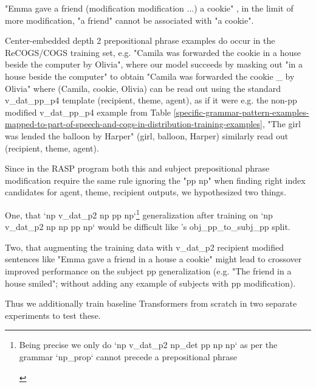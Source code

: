\documentclass[11pt]{article}
\begin{document}
{\begin{footnotesize}
"Emma gave a friend (modification modification ...) a cookie" , in the limit of more modification, "a friend" cannot be associated with "a cookie".

Center-embedded depth 2 prepositional phrase examples do occur in the ReCOGS/COGS training set, e.g. "Camila was forwarded the cookie in a house beside the computer by Olivia", where our model succeeds by masking out "in a house beside the computer" to obtain "Camila was forwarded the cookie \_ by Olivia" where (Camila, cookie, Olivia) can be read out using the standard v\_dat\_pp\_p4 template (recipient, theme, agent), as if it were e.g. the non-pp modified v\_dat\_pp\_p4 example from Table \ref{specific-grammar-pattern-examples-mapped-to-part-of-speech-and-cogs-in-distribution-training-examples}, "The girl was lended the balloon by Harper" (girl, balloon, Harper) similarly read out (recipient, theme, agent).
\end{footnotesize}}

Since in the RASP program both this and subject prepositional phrase modification require the same rule ignoring the "pp np" when finding right index candidates for agent, theme, recipient outputs, we hypothesized two things.

One, that `np v\_dat\_p2 np pp np`\footnote{\begin{footnotesize}Being precise we only do `np v\_dat\_p2 np\_det pp np np` as per the grammar `np\_prop` cannot precede a prepositional phrase\end{footnotesize}} generalization after training on `np v\_dat\_p2 np np pp np` would be difficult like \cite{Wu2023}'s obj\_pp\_to\_subj\_pp split.

Two, that augmenting the training data with v\_dat\_p2 recipient modified sentences like "Emma gave a friend in a house a cookie" might lead to crossover improved performance on the subject pp generalization (e.g. "The friend in a house smiled"; without adding any example of subjects with pp modification).

Thus we additionally train \cite{Wu2023} baseline Transformers from scratch in two separate experiments to test these.
\end{document}
